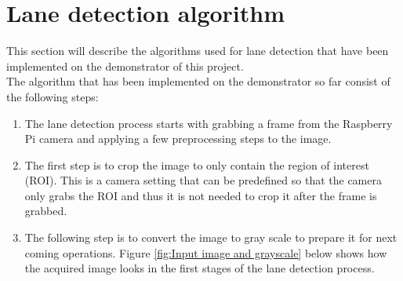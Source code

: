 \section{Lane detection algorithm}
This section will describe the algorithms used for lane detection that have been implemented on the demonstrator of this project.\\

The algorithm that has been implemented on the demonstrator so far consist of the following steps:\\

\begin{enumerate}  
\item The lane detection process starts with grabbing a frame from the Raspberry Pi camera and applying a few preprocessing steps to the image.\\
\item The first step is to crop the image to only contain the region of interest (ROI). This is a camera setting that can be predefined so that the camera only grabs the ROI and thus it is not needed to crop it after the frame is grabbed.\\
\item The following step is to convert the image to gray scale to prepare it for next coming operations. Figure \ref{fig:Input image and grayscale} below shows how the acquired image looks in the first stages of the lane detection process.
\end{enumerate}


